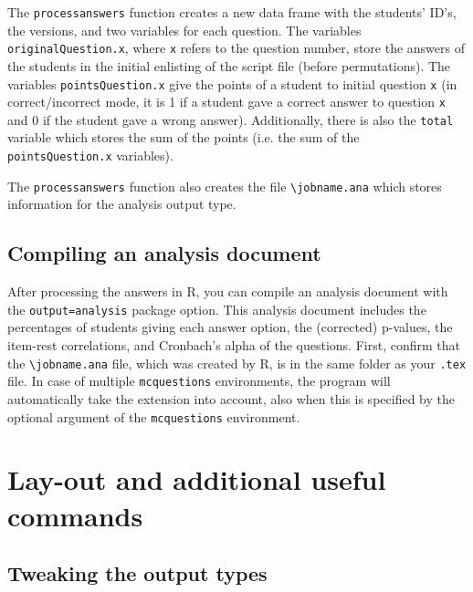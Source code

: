 \documentclass{article}
\begin{document}
The \verb$processanswers$ function creates a new data frame with the students' ID's, the versions, and two variables for each question. The variables \verb$originalQuestion.x$, where \verb$x$ refers to the question number, store the answers of the students in the initial enlisting of the script file (before permutations). The variables \verb$pointsQuestion.x$ give the points of a student to initial question \verb$x$ (in correct/incorrect mode, it is 1 if a student gave a correct answer to question \verb$x$ and 0 if the student gave a wrong answer). Additionally, there is also the \verb$total$ variable which stores the sum of the points (i.e. the sum of the \verb$pointsQuestion.x$ variables).

The \verb$processanswers$ function also creates the file \verb$\jobname.ana$ which stores information for the analysis output type.


  \subsection{Compiling an analysis document}
  
After processing the answers in R, you can compile an analysis document with the  \verb$output=analysis$ package option. This analysis document includes the percentages of students giving each answer option, the (corrected) p-values, the item-rest correlations, and Cronbach's alpha of the questions. First, confirm that the \verb$\jobname.ana$ file, which was created by R, is in the same folder as your \verb$.tex$ file. In case of multiple \verb$mcquestions$ environments, the program will automatically take the extension into account, also when this is specified by the optional argument of the \verb$mcquestions$ environment. 



 
 
 
 
 

\section{Lay-out and additional useful commands}  
  
  
\subsection{Tweaking the output types}
\end{document}
